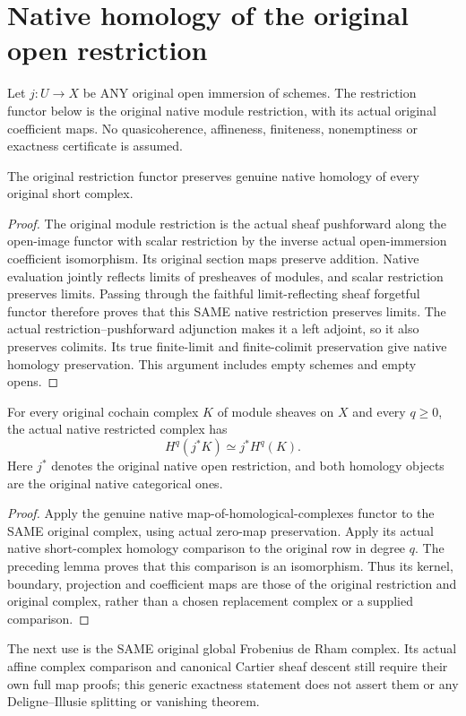 \section{Native homology of the original open restriction}
\label{sec:scheme-open-restriction-homology}

Let $j:U\to X$ be ANY original open immersion of schemes.
The restriction functor below is the original native module
restriction, with its actual original coefficient maps. No
quasicoherence, affineness, finiteness, nonemptiness or exactness
certificate is assumed.

\begin{lemma}
\label{lem:scheme-open-restriction-preserves-homology}
\leanok
{}
The original restriction functor preserves genuine native
homology of every original short complex.
\end{lemma}
\begin{proof}
The original module restriction is the actual sheaf pushforward
along the open-image functor with scalar restriction by the
inverse actual open-immersion coefficient isomorphism. Its
original section maps preserve addition. Native evaluation
jointly reflects limits of presheaves of modules, and scalar
restriction preserves limits. Passing through the faithful
limit-reflecting sheaf forgetful functor therefore proves that
this SAME native restriction preserves limits. The actual
restriction--pushforward adjunction makes it a left adjoint,
so it also preserves colimits. Its true finite-limit and
finite-colimit preservation give native homology preservation.
This argument includes empty schemes and empty opens.
\end{proof}

\begin{proposition}
\label{prop:scheme-open-restriction-complex-homology}
\leanok
{}
For every original cochain complex $K$ of module sheaves on $X$
and every $q\geq0$, the actual native restricted complex has
\[
 H^q(j^*K)\simeq j^*H^q(K).
\]
Here $j^*$ denotes the original native open restriction, and
both homology objects are the original native categorical ones.
\end{proposition}
\begin{proof}
Apply the genuine native map-of-homological-complexes functor
to the SAME original complex, using actual zero-map
preservation. Apply its actual native short-complex homology
comparison to the original row in degree $q$. The preceding
lemma proves that this comparison is an isomorphism. Thus its
kernel, boundary, projection and coefficient maps are those of
the original restriction and original complex, rather than a
chosen replacement complex or a supplied comparison.
\end{proof}

The next use is the SAME original global Frobenius de Rham
complex. Its actual affine complex comparison and canonical
Cartier sheaf descent still require their own full map proofs;
this generic exactness statement does not assert them or any
Deligne--Illusie splitting or vanishing theorem.
